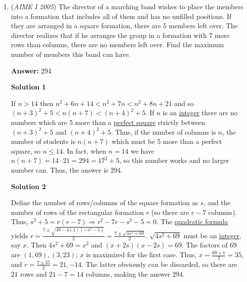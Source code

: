 \begin{enumerate}
 Thus there are $105+4=\boxed{109}$ integers that meet the given conditions.

 


	\item (\textit{AIME I 2005}) The director of a marching band wishes to place the members into a formation that includes all of them and has no unfilled positions. If they are arranged in a square formation, there are 5 members left over. The director realizes that if he arranges the group in a formation with 7 more rows than columns, there are no members left over. Find the maximum number of members this band can have.


 
 \textbf{Answer: }294



\textbf{Solution 1}

If $n > 14$ then $n^2 + 6n + 14 < n^2 + 7n < n^2 + 8n + 21$ and so $(n + 3)^2 + 5 < n(n + 7) < (n + 4)^2 + 5$.  If $n$ is an \href{https://artofproblemsolving.com/wiki/index.php?title=Integer}{integer} there are no numbers which are 5 more than a \href{https://artofproblemsolving.com/wiki/index.php?title=Perfect\_square}{perfect square} strictly between $(n + 3)^2 + 5$ and $(n + 4)^2 + 5$.  Thus, if the number of columns is $n$, the number of students is $n(n + 7)$ which must be 5 more than a perfect square, so $n \leq 14$.  In fact, when $n = 14$ we have $n(n + 7) = 14\cdot 21 = 294 = 17^2 + 5$, so this number works and no larger number can.  Thus, the answer is $\boxed{294}$.

 



\textbf{Solution 2}

Define the number of rows/columns of the square formation as $s$, and the number of rows of the rectangular formation $r$ (so there are $r - 7$ columns). Thus, $s^2 + 5 = r(r-7) \Longrightarrow r^2 - 7r - s^2 - 5 = 0$. The \href{https://artofproblemsolving.com/wiki/index.php?title=Quadratic\_formula}{quadratic formula} yields $r = \frac{7 \pm \sqrt{49 - 4(1)(-s^2 - 5)}}{2} = \frac{7 \pm \sqrt{4s^2 + 69}}{2}$. $\sqrt{4s^2 + 69}$ must be an \href{https://artofproblemsolving.com/wiki/index.php?title=Integer}{integer}, say $x$. Then $4s^2 + 69 = x^2$ and $(x + 2s)(x - 2s) = 69$. The factors of $69$ are $(1,69), (3,23)$; $x$ is maximized for the first case. Thus, $x = \frac{69 + 1}{2} = 35$, and $r = \frac{7 \pm 35}{2} = 21, -14$. The latter obviously can be discarded, so there are $21$ rows and $21 - 7 = 14$ columns, making the answer $294$.


\end{enumerate}
